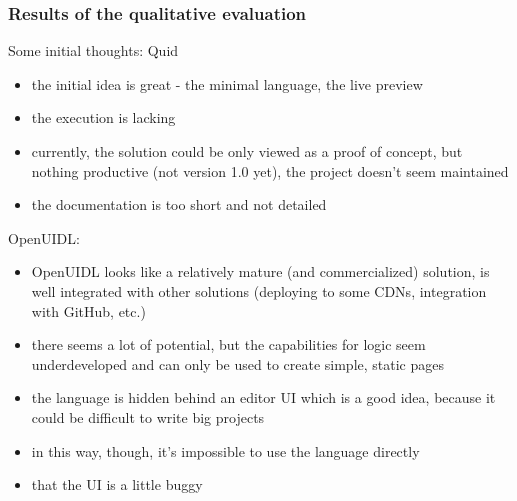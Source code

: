 \subsubsection{Results of the qualitative evaluation}

Some initial thoughts:
Quid
\begin{itemize}
    \item the initial idea is great - the minimal language, the live preview
    \item the execution is lacking
    \item currently, the solution could be only viewed as a proof of concept, but nothing productive (not version 1.0 yet), the project doesn't seem maintained
    \item the documentation is too short and not detailed
\end{itemize}


OpenUIDL:
\begin{itemize}
    \item OpenUIDL looks like a relatively mature (and commercialized) solution, is well integrated with other solutions (deploying to some CDNs, integration with GitHub, etc.)
    \item there seems a lot of potential, but the capabilities for logic seem underdeveloped and can only be used to create simple, static pages
    \item the language is hidden behind an editor UI which is a good idea, because it could be difficult to write big projects
    \item in this way, though, it's impossible to use the language directly
    \item that the UI is a little buggy
\end{itemize}
